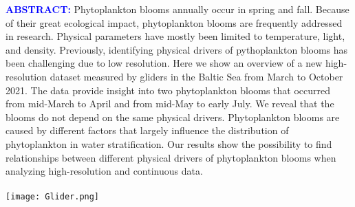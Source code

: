 \documentclass[../Main.tex]{subfiles}
\begin{document}
\begin{tcolorbox}[colback=light-orange, boxrule=0pt]
  \begin{multicols}{3}
    \textcolor{blue}{\textbf{ABSTRACT:}}
Phytoplankton blooms annually occur in spring and fall.
Because of their great ecological impact, phytoplankton blooms are frequently addressed in research.
Physical parameters have mostly been limited to temperature, light, and density.
Previously, identifying physical drivers of pythoplankton blooms has been challenging due to low resolution.
%
Here we show an overview of a new high-resolution dataset measured by gliders in the Baltic Sea from March to October 2021.
The data provide insight into two phytoplankton blooms that occurred from mid-March to April and from mid-May to early July.
We reveal that the blooms do not depend on the same physical drivers. 
Phytoplankton blooms are caused by different factors that largely influence the distribution of phytoplankton in water stratification. 
Our results show the possibility to find relationships between different physical drivers of phytoplankton blooms when analyzing high-resolution and continuous data. 
\ \\
\ \\
    \texttt{[image: Glider.png]}
 \end{multicols}
\end{tcolorbox}
\end{document}
